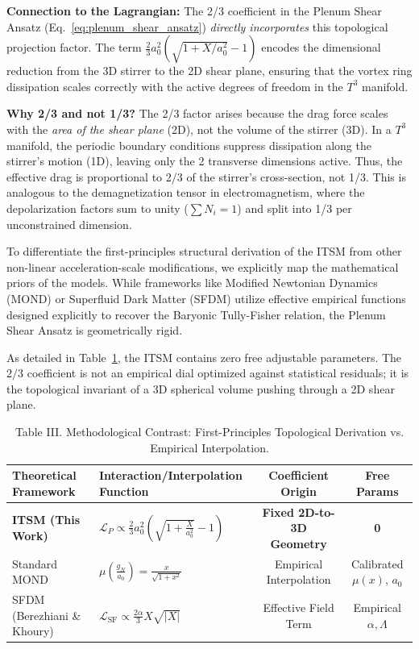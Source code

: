 \documentclass[aps,prd,10pt,twocolumn,superscriptaddress,nofootinbib]{revtex4-2}
\begin{document}
\textbf{Connection to the Lagrangian:}
The 2/3 coefficient in the Plenum Shear Ansatz (Eq.~\ref{eq:plenum_shear_ansatz}) \textit{directly incorporates} this topological projection factor.
The term $\frac{2}{3} a_0^2 \left( \sqrt{1 + X/a_0^2} - 1 \right)$ encodes the dimensional reduction from the 3D stirrer to the 2D shear plane, ensuring that the vortex ring dissipation scales correctly with the active degrees of freedom in the $T^3$ manifold.

\textbf{Why 2/3 and not 1/3?}
The 2/3 factor arises because the drag force scales with the \textit{area of the shear plane} (2D), not the volume of the stirrer (3D).
In a $T^3$ manifold, the periodic boundary conditions suppress dissipation along the stirrer's motion (1D), leaving only the 2 transverse dimensions active.
Thus, the effective drag is proportional to 2/3 of the stirrer's cross-section, not 1/3.
This is analogous to the demagnetization tensor in electromagnetism, where the depolarization factors sum to unity ($\sum N_i = 1$) and split into 1/3 per unconstrained dimension.

To differentiate the first-principles structural derivation of the ITSM from other non-linear acceleration-scale modifications, we explicitly map the mathematical priors of the models. While frameworks like Modified Newtonian Dynamics (MOND) or Superfluid Dark Matter (SFDM) utilize effective empirical functions designed explicitly to recover the Baryonic Tully-Fisher relation, the Plenum Shear Ansatz is geometrically rigid.

As detailed in Table~\ref{tab:mond_matrix}, the ITSM contains zero free adjustable parameters. The $2/3$ coefficient is not an empirical dial optimized against statistical residuals; it is the topological invariant of a 3D spherical volume pushing through a 2D shear plane.

\begin{table}[htbp]
\caption{\label{tab:mond_matrix}Table III. Methodological Contrast: First-Principles Topological Derivation vs. Empirical Interpolation.}
\begin{ruledtabular}
\begin{tabular}{llcc}
\textbf{Theoretical Framework} & \textbf{Interaction/Interpolation Function} & \textbf{Coefficient Origin} & \textbf{Free Params} \\
\hline
\textbf{ITSM (This Work)} & $\mathcal{L}_{P} \propto \frac{2}{3} a_0^2 \left(\sqrt{1+\frac{X}{a_0^2}}-1\right)$ & \textbf{Fixed 2D-to-3D Geometry} & \textbf{0} \\
Standard MOND & $\mu\left(\frac{g_N}{a_0}\right) = \frac{x}{\sqrt{1+x^2}}$ & Empirical Interpolation & Calibrated $\mu(x)$, $a_0$ \\
SFDM (Berezhiani \& Khoury) & $\mathcal{L}_{\text{SF}} \propto \frac{2\alpha}{3} X\sqrt{|X|}$ & Effective Field Term & Empirical $\alpha, \Lambda$ \\
\end{tabular}
\end{ruledtabular}
\end{table}
\end{document}
